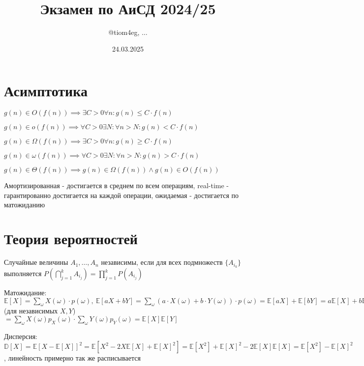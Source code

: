 \documentclass{article}
\title{Экзамен по АиСД 2024/25}
\author{@tiom4eg, $\dots$}
\date{24.03.2025}
\begin{document}
\maketitle

\tableofcontents
\newpage

\section{Асимптотика}

$g(n) \in O(f(n)) \implies \exists C > 0 \forall n : g(n) \leq C \cdot f(n)$

$g(n) \in o(f(n)) \implies \forall C > 0 \exists N : \forall n > N : g(n) < C \cdot f(n)$

$g(n) \in \Omega(f(n)) \implies \exists C > 0 \forall n : g(n) \geq C \cdot f(n)$

$g(n) \in \omega(f(n)) \implies \forall C > 0 \exists N : \forall n > N : g(n) > C \cdot f(n)$

$g(n) \in \Theta(f(n)) \implies g(n) \in \Omega(f(n)) \land g(n) \in O(f(n))$

Амортизированная - достигается в среднем по всем операциям, real-time - гарантированно достигается на каждой операции, ожидаемая - достигается по матожиданию

\section{Теория вероятностей}

Случайные величины $A_1, \dots, A_n$ независимы, если для всех подмножеств $\{A_{i_k}\}$ выполняется $P(\bigcap \limits_{j=1}^{k} A_{i_j}) = \prod \limits_{j=1}^{k} P(A_{i_j})$

Матожидание: $\mathbb{E}[X] = \sum \limits_{\omega} X(\omega) \cdot p(\omega), \ \mathbb{E}[aX + bY] = \sum \limits_{\omega} (a \cdot X(\omega) + b \cdot Y(\omega)) \cdot p(\omega) = \mathbb{E}[aX] + \mathbb{E}[bY] = a \mathbb{E}[X] + b \mathbb{E}[Y], \ \mathbb{E}[XY] = \sum \limits_{\omega} X(\omega) Y(\omega) p_X(\omega) p_Y(\omega)$ (для независимых $X, Y$) $= \sum \limits_{\omega} X(\omega) p_X(\omega) \cdot \sum \limits_{\omega} Y(\omega) p_Y(\omega) = \mathbb{E}[X] \mathbb{E}[Y]$

Дисперсия: $\mathbb{D}[X] = \mathbb{E}[X - \mathbb{E}[X]]^2 = \mathbb{E}[X^2 - 2X\mathbb{E}[X] + \mathbb{E}[X]^2] = \mathbb{E}[X^2] + \mathbb{E}[X]^2 - 2\mathbb{E}[X]\mathbb{E}[X] = \mathbb{E}[X^2] - \mathbb{E}[X]^2$, линейность примерно так же расписывается

\end{document}
